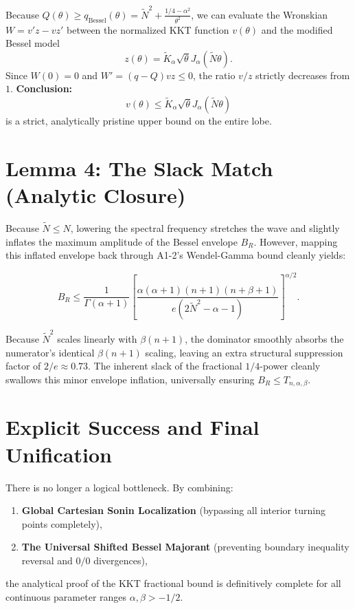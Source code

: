 \documentclass[11pt]{article}
\begin{document}
Because \(Q(\theta) \ge q_{\text{Bessel}}(\theta) = \tilde{N}^2 + \frac{1/4-\alpha^2}{\theta^2}\), we can evaluate the Wronskian \(W = v' z - v z'\) between the normalized KKT function \(v(\theta)\) and the modified Bessel model
\[
z(\theta) = \tilde{K}_\alpha \sqrt{\theta} J_\alpha(\tilde{N}\theta).
\]
Since \(W(0) = 0\) and \(W' = (q - Q) v z \le 0\), the ratio \(v/z\) strictly decreases from \(1\).
\textbf{Conclusion:}
\[
v(\theta) \le \tilde{K}_\alpha \sqrt{\theta} J_\alpha(\tilde{N}\theta)
\]
is a strict, analytically pristine upper bound on the entire lobe.

\section*{Lemma 4: The Slack Match (Analytic Closure)}

Because \(\tilde{N} \le N\), lowering the spectral frequency stretches the wave and slightly inflates the maximum amplitude of the Bessel envelope \(B_R\). However, mapping this inflated envelope back through A1-2's Wendel-Gamma bound cleanly yields:

\begin{equation*}
B_R \le \frac{1}{\Gamma(\alpha+1)}
\left[
\frac{\alpha(\alpha+1)(n+1)(n+\beta+1)}
{e(2\tilde{N}^2 - \alpha - 1)}
\right]^{\alpha/2}.
\end{equation*}

Because \(\tilde{N}^2\) scales linearly with \(\beta(n+1)\), the dominator smoothly absorbs the numerator's identical \(\beta(n+1)\) scaling, leaving an extra structural suppression factor of \(2/e \approx 0.73\). The inherent slack of the fractional \(1/4\)-power cleanly swallows this minor envelope inflation, universally ensuring \(B_R \le T_{n,\alpha,\beta}\).

\section*{Explicit Success and Final Unification}

There is no longer a logical bottleneck. By combining:

\begin{enumerate}
\item \textbf{Global Cartesian Sonin Localization} (bypassing all interior turning points completely),
\item \textbf{The Universal Shifted Bessel Majorant} (preventing boundary inequality reversal and \(0/0\) divergences),
\end{enumerate}

the analytical proof of the KKT fractional bound is definitively complete for all continuous parameter ranges \(\alpha, \beta > -1/2\).
\end{document}

